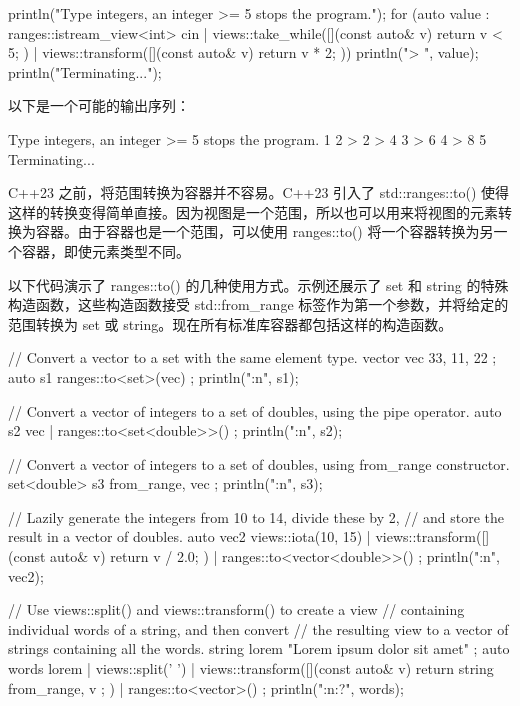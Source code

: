 \begin{cpp}
println("Type integers, an integer >= 5 stops the program.");
for (auto value : ranges::istream_view<int> { cin }
    | views::take_while([](const auto& v) { return v < 5; })
    | views::transform([](const auto& v) { return v * 2; })) {
    println("> {}", value);
}
println("Terminating...");
\end{cpp}

以下是一个可能的输出序列：

\begin{shell}
Type integers, an integer >= 5 stops the program.
1 2
> 2
> 4
3
> 6
4
> 8
5
Terminating...
\end{shell}



C++23 之前，将范围转换为容器并不容易。C++23 引入了 std::ranges::to() 使得这样的转换变得简单直接。因为视图是一个范围，所以也可以用来将视图的元素转换为容器。由于容器也是一个范围，可以使用 ranges::to() 将一个容器转换为另一个容器，即使元素类型不同。

以下代码演示了 ranges::to() 的几种使用方式。示例还展示了 set 和 string 的特殊构造函数，这些构造函数接受 std::from\_range 标签作为第一个参数，并将给定的范围转换为 set 或 string。现在所有标准库容器都包括这样的构造函数。

\begin{cpp}
// Convert a vector to a set with the same element type.
vector vec { 33, 11, 22 };
auto s1 { ranges::to<set>(vec) };
println("{:n}", s1);

// Convert a vector of integers to a set of doubles, using the pipe operator.
auto s2 { vec | ranges::to<set<double>>() };
println("{:n}", s2);

// Convert a vector of integers to a set of doubles, using from_range constructor.
set<double> s3 { from_range, vec };
println("{:n}", s3);

// Lazily generate the integers from 10 to 14, divide these by 2,
// and store the result in a vector of doubles.
auto vec2 { views::iota(10, 15)
    | views::transform([](const auto& v) { return v / 2.0; })
    | ranges::to<vector<double>>() };
println("{:n}", vec2);

// Use views::split() and views::transform() to create a view
// containing individual words of a string, and then convert
// the resulting view to a vector of strings containing all the words.
string lorem { "Lorem ipsum dolor sit amet" };
auto words { lorem | views::split(' ')
    | views::transform([](const auto& v) { return string { from_range, v }; })
    | ranges::to<vector>() };
println("{:n:?}", words);
\end{cpp}

